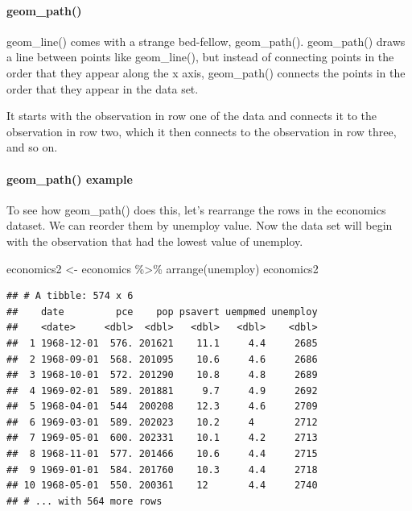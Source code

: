 \documentclass[
]{article}
\newenvironment{Shaded}{\begin{snugshade}}{\end{snugshade}}
\newcommand{\FunctionTok}[1]{\textcolor[rgb]{0.00,0.00,0.00}{#1}}
\newcommand{\NormalTok}[1]{#1}
\newcommand{\OtherTok}[1]{\textcolor[rgb]{0.56,0.35,0.01}{#1}}
\newcommand{\SpecialCharTok}[1]{\textcolor[rgb]{0.00,0.00,0.00}{#1}}
\begin{document}
\hypertarget{geom_path}{%
\paragraph{geom\_path()}\label{geom_path}}

geom\_line() comes with a strange bed-fellow, geom\_path(). geom\_path()
draws a line between points like geom\_line(), but instead of connecting
points in the order that they appear along the x axis, geom\_path()
connects the points in the order that they appear in the data set.

It starts with the observation in row one of the data and connects it to
the observation in row two, which it then connects to the observation in
row three, and so on.

\hypertarget{geom_path-example}{%
\paragraph{geom\_path() example}\label{geom_path-example}}

To see how geom\_path() does this, let's rearrange the rows in the
economics dataset. We can reorder them by unemploy value. Now the data
set will begin with the observation that had the lowest value of
unemploy.

\begin{Shaded}
\begin{Highlighting}[]
\NormalTok{economics2 }\OtherTok{\textless{}{-}}\NormalTok{ economics }\SpecialCharTok{\%\textgreater{}\%} 
  \FunctionTok{arrange}\NormalTok{(unemploy)}
\NormalTok{economics2}
\end{Highlighting}
\end{Shaded}

\begin{verbatim}
## # A tibble: 574 x 6
##    date         pce    pop psavert uempmed unemploy
##    <date>     <dbl>  <dbl>   <dbl>   <dbl>    <dbl>
##  1 1968-12-01  576. 201621    11.1     4.4     2685
##  2 1968-09-01  568. 201095    10.6     4.6     2686
##  3 1968-10-01  572. 201290    10.8     4.8     2689
##  4 1969-02-01  589. 201881     9.7     4.9     2692
##  5 1968-04-01  544  200208    12.3     4.6     2709
##  6 1969-03-01  589. 202023    10.2     4       2712
##  7 1969-05-01  600. 202331    10.1     4.2     2713
##  8 1968-11-01  577. 201466    10.6     4.4     2715
##  9 1969-01-01  584. 201760    10.3     4.4     2718
## 10 1968-05-01  550. 200361    12       4.4     2740
## # ... with 564 more rows
\end{verbatim}
\end{document}
